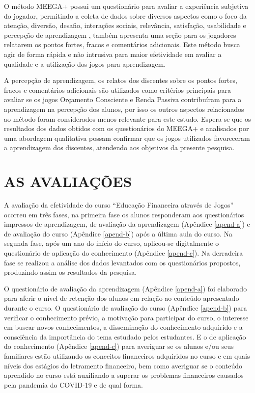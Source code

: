 O método MEEGA+ possui um questionário para avaliar a experiência subjetiva do jogador, permitindo a coleta de dados sobre diversos aspectos como o foco da atenção, diversão, desafio, interações sociais, relevância, satisfação, usabilidade e percepção de aprendizagem \cite{petri2017}, também apresenta uma seção para os jogadores relatarem os pontos fortes, fracos e comentários adicionais. Este método busca agir de forma rápida e não intrusiva para maior efetividade em avaliar a qualidade e a utilização dos jogos para aprendizagem.

A percepção de aprendizagem, os relatos dos discentes sobre os pontos fortes, fracos e comentários adicionais são utilizados como critérios principais para avaliar se os jogos Orçamento Consciente e Renda Passiva contribuíram para a aprendizagem na percepção dos alunos, por isso os outros aspectos relacionados ao método foram considerados menos relevante para este estudo. Espera-se que os resultados dos dados obtidos com os questionários do MEEGA+ e analisados por uma abordagem qualitativa possam confirmar que os jogos utilizados favoreceram a aprendizagem dos discentes, atendendo aos objetivos da presente pesquisa.

\section{AS AVALIAÇÕES}
A avaliação da efetividade do curso “Educação Financeira através de Jogos” ocorreu em três fases, na primeira fase os alunos responderam aos questionários impressos de aprendizagem, de avaliação da aprendizagem (Apêndice \ref{apend-a}) e de avaliação do curso (Apêndice \ref{apend-b}) após a última aula do curso. Na segunda fase, após um ano do início do curso, aplicou-se digitalmente o questionário de aplicação do conhecimento (Apêndice \ref{apend-c}). Na derradeira fase se realizou a análise dos dados levantados com os questionários propostos, produzindo assim os resultados da pesquisa.

O questionário de avaliação da aprendizagem (Apêndice \ref{apend-a}) foi elaborado para aferir o nível de retenção dos alunos em relação ao conteúdo apresentado durante o curso. O questionário de avaliação do curso (Apêndice \ref{apend-b}) para verificar o conhecimento prévio, a motivação para participar do curso, o interesse em buscar novos conhecimentos, a disseminação do conhecimento adquirido e a consciência da importância do tema estudado pelos estudantes. E o de aplicação do conhecimento (Apêndice \ref{apend-c}) para averiguar se os alunos e/ou seus familiares estão utilizando os conceitos financeiros adquiridos no curso e em quais níveis dos estágios do letramento financeiro, bem como averiguar se o conteúdo aprendido no curso está auxiliando a superar os problemas financeiros causados pela pandemia do COVID-19 e de qual forma.

